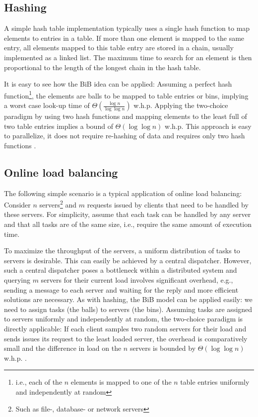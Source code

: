 \documentclass[a4paper,12pt]{article}
\begin{document}
\subsection{Hashing}
\label{sec:hashing}
A simple hash table implementation typically uses a single hash function to map elements to entries in a table. If more than one element is mapped to the same entry, all elements mapped to this table entry are stored in a chain, usually implemented as a linked list. The maximum time to search for an element is then proportional to the length of the longest chain in the hash table. 

It is easy to see how the BiB idea can be applied: Assuming a perfect hash function\footnote{i.e., each of the $n$ elements is mapped to one of the $n$ table entries uniformly and independently at random}, the elements are balls to be mapped to table entries or bins, implying a worst case look-up time of $\Theta\left(\frac{\log n}{\log \log n}\right)$ w.h.p. Applying the two-choice paradigm by using two hash functions and mapping elements to the least full of two table entries implies a bound of $\Theta\left(\log \log n\right)$ w.h.p. This approach is easy to parallelize, it does not require re-hashing of data and requires only two hash functions \cite{ABKU99} \cite{MRS01}.

\subsection{Online load balancing}
\label{sec:loadbalancing}
The following simple scenario is a typical application of online load balancing: Consider $n$ servers\footnote{Such as file-, database- or network servers} and $m$ requests issued by clients that need to be handled by these servers. For simplicity, assume that each task can be handled by any server and that all tasks are of the same size, i.e., require the same amount of execution time.

To maximize the throughput of the servers, a uniform distribution of tasks to servers is desirable. This can easily be achieved by a central dispatcher. However, such a central dispatcher poses a bottleneck within a distributed system and querying $m$ servers for their current load involves significant overhead, e.g., sending a message to each server and waiting for the reply and more efficient solutions are necessary. As with hashing, the BiB model can be applied easily: we need to assign tasks (the balls) to servers (the bins). Assuming tasks are assigned to servers uniformly and independently at random, the two-choice paradigm is directly applicable: If each client samples two random servers for their load and sends issues its request to the least loaded server, the overhead is comparatively small and the difference in load on the $n$ servers is bounded by $\Theta\left(\log \log n\right)$ w.h.p. \cite{KLM92} \cite{RS98} \cite{MRS01}.  
\end{document}
